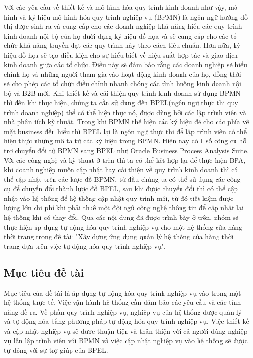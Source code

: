 Với các yêu cầu về thiết kế và mô hình hóa quy trình kinh doanh như vậy, mô hình và ký hiệu mô hình hóa quy trình nghiệp vụ (BPMN) là ngôn ngữ hướng đồ thị được sinh ra và cung cấp cho các doanh nghiệp khả năng hiểu các quy trình kinh doanh nội bộ của họ dưới dạng ký hiệu đồ họa và sẽ cung cấp cho các tổ chức khả năng truyền đạt các quy trình này theo cách tiêu chuẩn. Hơn nữa, ký hiệu đồ họa sẽ tạo điều kiện cho sự hiểu biết về hiệu suất hợp tác và giao dịch kinh doanh giữa các tổ chức. Điều này sẽ đảm bảo rằng các doanh nghiệp sẽ hiểu chính họ và những người tham gia vào hoạt động kinh doanh của họ, đồng thời sẽ cho phép các tổ chức điều chỉnh nhanh chóng các tình huống kinh doanh nội bộ và B2B mới. Khi thiết kế và cải thiện quy trình kinh doanh sử dụng BPMN thì đến khi thực hiện, chúng ta cần sử dụng đến BPEL(ngôn ngữ thực thi quy trình doanh nghiệp) thể có thể hiện thực nó, được dùng bởi các lập trình viên và nhà phân tích kỹ thuật. Trong khi BPMN thể hiện các ký hiệu để cho các phía về mặt business đều hiểu thì BPEL lại là ngôn ngữ thực thi để lập trình viên có thể hiện thực những mô tả từ các ký hiệu trong BPMN. Hiện nay có 1 số công cụ hỗ trợ chuyển đổi từ BPMN sang BPEL như Oracle Business Process Analysis Suite. Với các công nghệ và kỹ thuật ở trên thì ta có thể kết hợp lại để thực hiện BPA, khi doanh nghiệp muốn cập nhật hay cải thiện về quy trình kinh doanh thì có thể cập nhật trên các lược đồ BPMN, từ đầu chúng ta có thể sử dụng các công cụ để chuyển đổi thành lược đồ BPEL, sau khi được chuyển đổi thì có thể cập nhật vào hệ thống để hệ thống cập nhật quy trình mới, từ đó tiết kiệm được lượng lớn chi phí khi phải thuê một đội ngũ công nghệ thông tin để cập nhật lại hệ thống khi có thay đổi. Qua các nội dung đã được trình bày ở trên, nhóm sẽ thực hiện áp dụng tự động hóa quy trình nghiệp vụ cho một hệ thống cửa hàng thời trang trong đề tài: "Xây dựng ứng dụng quản lý hệ thống cửa hàng thời trang dựa trên việc tự động hóa quy trình nghiệp vụ".\\


\subsection{Mục tiêu đề tài}
\hspace{0.5cm} Mục tiêu của đề tài là áp dụng tự động hóa quy trình nghiệp vụ vào trong một hệ thống thực tế. Việc vận hành hệ thống cần đảm bảo các yêu cầu và các tính năng đề ra. Về phần quy trình nghiệp vụ, nghiệp vụ của hệ thống được quản lý và tự động hóa bằng phương pháp tự động hóa quy trình nghiệp vụ. Việc thiết kế và cập nhật nghiệp vụ sẽ được thuận tiện và thân thiện với cả người dùng nghiệp vụ lẫn lập trình viên với BPMN và việc cập nhật nghiệp vụ vào hệ thống sẽ được tự động với sự trợ giúp của BPEL.

